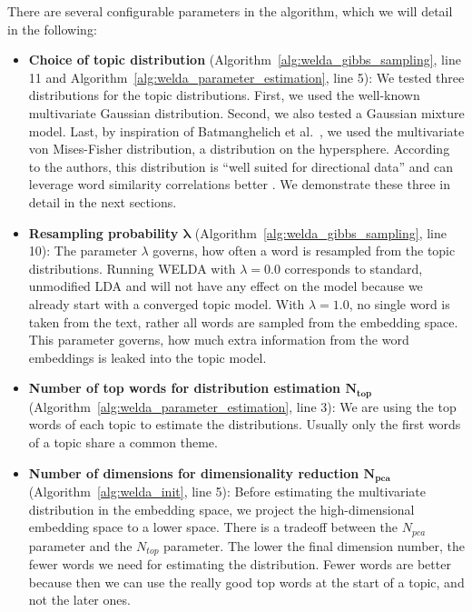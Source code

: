 \documentclass[
        a4paper,
        titlepage,
        twoside,
        parskip,
        numbers=noenddot
        ]{scrbook}
\theoremstyle{break}
\begin{document}
There are several configurable parameters in the algorithm, which we will detail in the following:
\begin{itemize}
  \item \textbf{Choice of topic distribution} (Algorithm~\ref{alg:welda_gibbs_sampling}, line 11 and Algorithm~\ref{alg:welda_parameter_estimation}, line 5):
    We tested three distributions for the topic distributions.
    First, we used the well-known multivariate Gaussian distribution.
    Second, we also tested a Gaussian mixture model.
    Last, by inspiration of Batmanghelich et al.\ \cite{Batmanghelich2016}, we used the multivariate von Mises-Fisher distribution, a distribution on the hypersphere.
    According to the authors, this distribution is ``well suited for directional data'' and can leverage word similarity correlations better \cite{Batmanghelich2016}.
    We demonstrate these three in detail in the next sections.
  \item \textbf{Resampling probability $\boldsymbol{\lambda}$} (Algorithm~\ref{alg:welda_gibbs_sampling}, line 10):
    The parameter $\lambda$ governs, how often a word is resampled from the topic distributions.
    Running WELDA with $\lambda = 0.0$ corresponds to standard, unmodified LDA and will not have any effect on the model because we already start with a converged topic model.
    With $\lambda = 1.0$, no single word is taken from the text, rather all words are sampled from the embedding space.
    This parameter governs, how much extra information from the word embeddings is leaked into the topic model.
  \item \textbf{Number of top words for distribution estimation $\boldsymbol{N_{top}}$} (Algorithm~\ref{alg:welda_parameter_estimation}, line 3):
    We are using the top words of each topic to estimate the distributions.
    Usually only the first words of a topic share a common theme.
  \item \textbf{Number of dimensions for dimensionality reduction $\boldsymbol{N_{pca}}$} (Algorithm~\ref{alg:welda_init}, line 5):
    Before estimating the multivariate distribution in the embedding space, we project the high-dimensional embedding space to a lower space.
    There is a tradeoff between the $N_{pca}$ parameter and the $N_{top}$ parameter.
    The lower the final dimension number, the fewer words we need for estimating the distribution.
    Fewer words are better because then we can use the really good top words at the start of a topic, and not the later ones.

\end{itemize}
\end{document}
